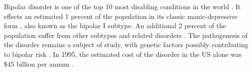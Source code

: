 Bipolar disorder is one of the top 10 most disabling conditions in the world \cite{kupfer_increasing_2005}. It effects an estimated 1 percent of the population in its classic manic-depressive form \cite{weissman_cross-national_1996}, also known as the bipolar I subtype. An additional 2 percent of the population suffer from other subtypes and related disorders \cite{kupfer_increasing_2005}. The pathogenesis of the disorder remains a subject of study, with genetic factors possibly contributing to bipolar risk \cite{fears_multisystem_2014}. In 1995, the estimated cost of the disorder in the US alone was \$45 billion per annum \cite{wyatt_economic_1995}. 